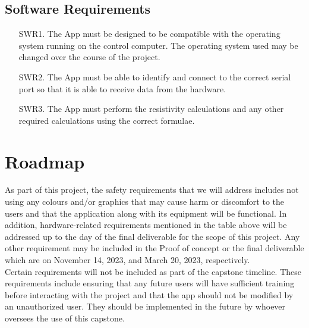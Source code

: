 \documentclass{article}
\begin{document}
\subsection*{Software Requirements}
\begin{enumerate}
  \item[SWR1.] The App must be designed to be compatible with the operating system running on the control computer. The operating system used may be changed over the course of the project. 
  \item[SWR2.] The App must be able to identify and connect to the correct serial port so that it is able to receive data from the hardware. 
  \item[SWR3.]  The App must perform the resistivity calculations and any other required calculations using the correct formulae. \\
\end{enumerate}

\section{Roadmap}

As part of this project, the safety requirements that we will address
includes not using any colours and/or graphics that may cause harm or discomfort to the users
and that the application along with its equipment will be functional.
In addition, hardware-related requirements mentioned in the table above will be addressed up to the day of the final deliverable for the scope of this project.
Any other requirement may be included in the Proof of concept or the final deliverable 
which are on November 14, 2023, and March 20, 2023, respectively. \\

\noindent Certain requirements will not be included as part of the capstone timeline.
These requirements include ensuring that any future users will have sufficient training before interacting with the project
and that the app should not be modified by an unauthorized user. 
They should be implemented in the future by whoever oversees the use of this capstone.



\end{document}
